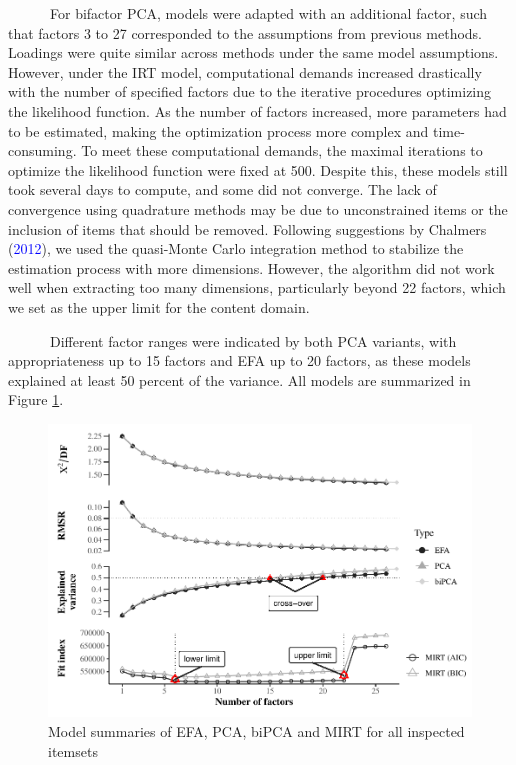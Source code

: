 \documentclass[
  man,floatsintext]{apa7}
\begin{document}
~~~~~~For bifactor PCA, models were adapted with an additional factor, such that factors 3 to 27 corresponded to the assumptions from previous methods. Loadings were quite similar across methods under the same model assumptions. However, under the IRT model, computational demands increased drastically with the number of specified factors due to the iterative procedures optimizing the likelihood function. As the number of factors increased, more parameters had to be estimated, making the optimization process more complex and time-consuming. To meet these computational demands, the maximal iterations to optimize the likelihood function were fixed at 500. Despite this, these models still took several days to compute, and some did not converge. The lack of convergence using quadrature methods may be due to unconstrained items or the inclusion of items that should be removed. Following suggestions by Chalmers (\textcolor{blue}{2012}), we used the quasi-Monte Carlo integration method to stabilize the estimation process with more dimensions. However, the algorithm did not work well when extracting too many dimensions, particularly beyond 22 factors, which we set as the upper limit for the content domain.

~~~~~~Different factor ranges were indicated by both PCA variants, with appropriateness up to 15 factors and EFA up to 20 factors, as these models explained at least 50 percent of the variance. All models are summarized in Figure \ref{fig:myfig23}.

\footnotesize

\begin{figure}[H]
\caption[Model summaries of EFA, PCA, biPCA and MIRT for all inspected itemsets]{Model summaries of EFA, PCA, biPCA and MIRT for all inspected itemsets}\label{fig:myfig23}
\includegraphics[width=1\linewidth]{2024-06-09_MA_March2024_neuer_verlauf_files/figure-latex/myfig23-1} \end{figure}
\end{document}
